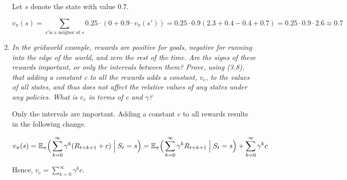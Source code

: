 \documentclass[12pt,a4paper]{article}
\begin{document}
\begin{enumerate}
  Let $s$ denote the state with value $0.7$.

  \[v_\pi(s) = \sum\limits_{s' \text{is a neigbor of } s} 0.25 \cdot  (0 + 0.9 \cdot v_\pi(s')) =
  0.25 \cdot 0.9(2.3 + 0.4 - 0.4 + 0.7) = 0.25 \cdot 0.9 \cdot 2.6 \approx 0.7\]

\item
  \textit{In the gridworld example, rewards are positive for goals, negative for
  running into the edge of the world, and zero the rest of the time. Are the signs of these
  rewards important, or only the intervals between them? Prove, using (3.8), that adding a
  constant c to all the rewards adds a constant, $v_c$, to the values of all states, and thus
  does not affect the relative values of any states under any policies. What is $v_c$ in terms
  of c and $\gamma$?}

  Only the intervals are important. Adding a constant $c$ to all rewards results in
  the following change.

  \[
  v_\pi(s) = \mathbb{E}_\pi \Big(\sum\limits_{k = 0}^\infty \gamma^k (R_{t + k + 1} + c) \Bigm\lvert S_t = s\Big)
  = \mathbb{E}_\pi \Big(\sum\limits_{k = 0}^\infty \gamma^k R_{t + k + 1} \Bigm\lvert S_t = s\Big) +
  \sum\limits_{k = 0}^\infty \gamma^k c
  \]

  Hence, $v_c = \sum\limits_{k = 0}^\infty \gamma^k c$.


\end{enumerate}
\end{document}
